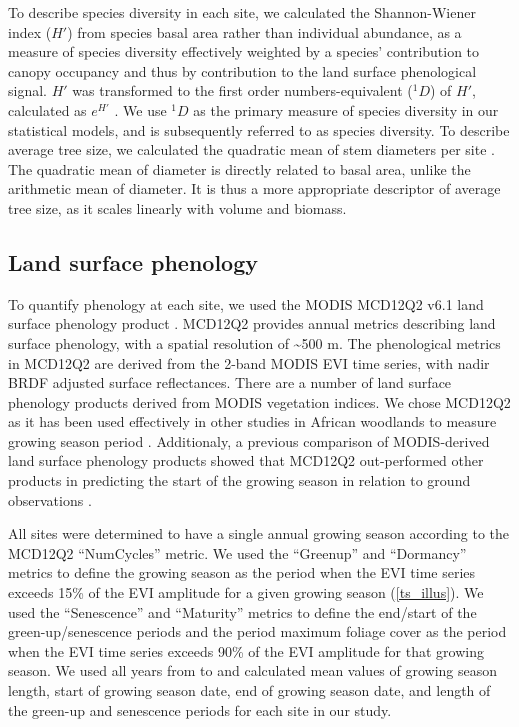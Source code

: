\documentclass[11pt,a4paper]{article}
\begin{document}
\setlength{\tabcolsep}{2pt} %

\setlength{\tabcolsep}{4pt} %

To describe species diversity in each site, we calculated the Shannon-Wiener index ($H'$) from species basal area rather than individual abundance, as a measure of species diversity effectively weighted by a species' contribution to canopy occupancy and thus by contribution to the land surface phenological signal. $H'$ was transformed to the first order numbers-equivalent ($^1\!D$) of $H'$, calculated as $e^{H'}$ \citep{Jost2007}. We use $^1\!D$ as the primary measure of species diversity in our statistical models, and is subsequently referred to as species diversity. To describe average tree size, we calculated the quadratic mean of stem diameters per site \citep{Curtis2000}. The quadratic mean of diameter is directly related to basal area, unlike the arithmetic mean of diameter. It is thus a more appropriate descriptor of average tree size, as it scales linearly with volume and biomass.

\subsection{Land surface phenology}

To quantify phenology at each site, we used the MODIS MCD12Q2 v6.1 land surface phenology product \citet{MCD12Q2}. MCD12Q2 provides annual metrics describing land surface phenology, with a spatial resolution of \textasciitilde{500 m}. The phenological metrics in MCD12Q2 are derived from the 2-band MODIS EVI time series, with nadir BRDF adjusted surface reflectances. There are a number of land surface phenology products derived from MODIS vegetation indices. We chose MCD12Q2 as it has been used effectively in other studies in African woodlands to measure growing season period \citep{}. Additionaly, a previous comparison of MODIS-derived land surface phenology products showed that MCD12Q2 out-performed other products in predicting the start of the growing season in relation to ground observations \citep{Peng2017}. 

All sites were determined to have a single annual growing season according to the MCD12Q2 ``NumCycles'' metric. We used the ``Greenup'' and ``Dormancy'' metrics to define the growing season as the period when the EVI time series exceeds 15\% of the EVI amplitude for a given growing season (\autoref{ts_illus}). We used the ``Senescence'' and ``Maturity'' metrics to define the end/start of the green-up/senescence periods and the period maximum foliage cover as the period when the EVI time series exceeds 90\% of the EVI amplitude for that growing season. We used all years from \modisStart{} to \modisEnd{} and calculated mean values of growing season length, start of growing season date, end of growing season date, and length of the green-up and senescence periods for each site in our study.
\end{document}
